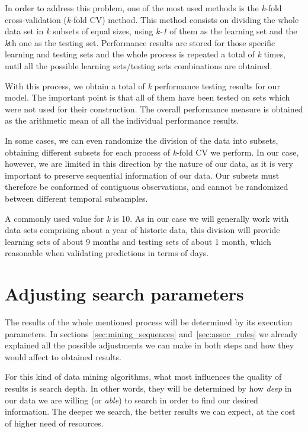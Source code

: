 In order to address this problem, one of the most used methods is the \textit{k}-fold cross-validation (\textit{k}-fold CV) method. This method consists on dividing the whole data set in \textit{k} subsets of equal sizes, using \textit{k-1} of them as the learning set and the \textit{k}th one as the testing set. Performance results are stored for those specific learning and testing sets and the whole process is repeated a total of \textit{k} times, until all the possible learning sets/testing sets combinations are obtained.

With this process, we obtain a total of \textit{k} performance testing results for our model. The important point is that all of them have been tested on sets which were not used for their construction. The overall performance measure is obtained as the arithmetic mean of all the individual performance results.

In some cases, we can even randomize the division of the data into subsets, obtaining different subsets for each process of \textit{k}-fold CV we perform. In our case, however, we are limited in this direction by the nature of our data, as it is very important to preserve sequential information of our data. Our subsets must therefore be conformed of contiguous observations, and cannot be randomized between different temporal subsamples.

A commonly used value for \textit{k} is 10. As in our case we will generally work with data sets comprising about a year of historic data, this division will provide learning sets of about 9 months and testing sets of about 1 month, which reasonable when validating predictions in terms of days.

\section{Adjusting search parameters}
\label{sec:search_parameters}
The results of the whole mentioned process will be determined by its execution parameters. In sections~\ref{sec:mining_sequences} and~\ref{sec:assoc_rules} we already explained all the possible adjustments we can make in both steps and how they would affect to obtained results. 

For this kind of data mining algorithms, what most influences the quality of results is search depth. In other words, they will be determined by how \emph{deep} in our data we are willing (or \emph{able}) to search in order to find our desired information. The deeper we search, the better results we can expect, at the cost of higher need of resources.

